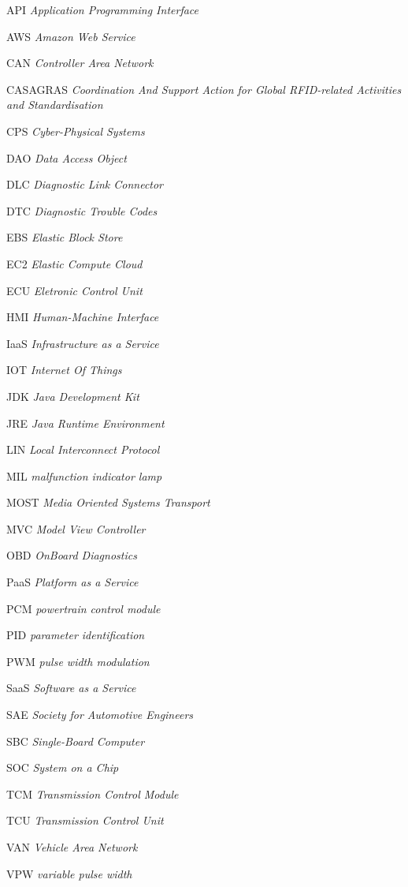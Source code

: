 \documentclass[
        12pt,
        openany, %
        oneside, %
        a4paper,			
        english,			
        brazil			        %
        abntfigtabnum     
        ]{abntbibifspcampinas}
\begin{document}
\begin{siglas} %
\item[{API}]\emph{Application Programming Interface}%
\item[{AWS}]\emph{Amazon Web Service}%
\item[{CAN}]\emph{Controller Area Network}%
\item[{CASAGRAS}]\emph{Coordination And Support Action for Global RFID-related Activities and Standardisation}%
\item[{CPS}]\emph{Cyber-Physical Systems}%
\item[{DAO}]\emph{Data Access Object}%
\item[{DLC}]\emph{Diagnostic Link Connector}%
\item[{DTC}]\emph{Diagnostic Trouble Codes}%
\item[{EBS}]\emph{Elastic Block Store}%
\item[{EC2}]\emph{Elastic Compute Cloud}%
\item[{ECU}]\emph{Eletronic Control Unit}%
\item[{HMI}]\emph{Human-Machine Interface}%
\item[{IaaS}]\emph{Infrastructure as a Service}%
\item[{IOT}]\emph{Internet Of Things}%
\item[{JDK}]\emph{Java Development Kit}%
\item[{JRE}]\emph{Java Runtime Environment}%
\item[{LIN}]\emph{Local Interconnect Protocol}%
\item[{MIL}]\emph{malfunction indicator lamp}%
\item[{MOST}]\emph{Media Oriented Systems Transport}%
\item[{MVC}]\emph{Model View Controller}%
\item[{OBD}]\emph{OnBoard Diagnostics}%
\item[{PaaS}]\emph{Platform as a Service}%
\item[{PCM}]\emph{powertrain control module}%
\item[{PID}]\emph{parameter identification}%
\item[{PWM}]\emph{pulse width modulation}%
\item[{SaaS}]\emph{Software as a Service}%
\item[{SAE}]\emph{Society for Automotive Engineers}%
\item[{SBC}]\emph{Single-Board Computer}%
\item[{SOC}]\emph{System on a Chip}%
\item[{TCM}]\emph{Transmission Control Module}%
\item[{TCU}]\emph{Transmission Control Unit}%
\item[{VAN}]\emph{Vehicle Area Network}%
\item[{VPW}]\emph{variable pulse width}%
\end{siglas}
\end{document}
